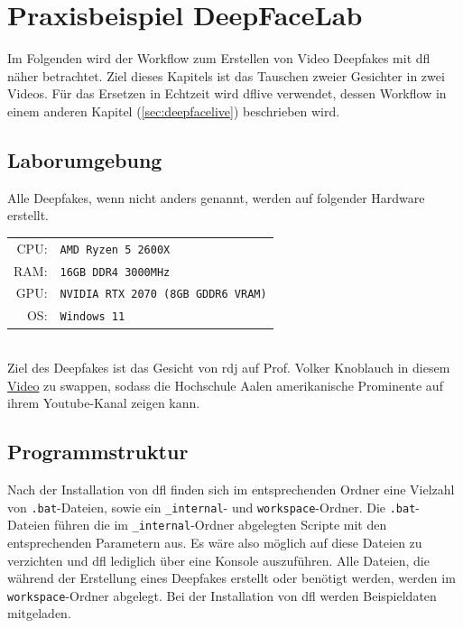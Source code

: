 \section{Praxisbeispiel DeepFaceLab}\label{sec:praxisbeispiel-dfl}
Im Folgenden wird der Workflow zum Erstellen von Video Deepfakes mit \gls{dfl} näher betrachtet.
Ziel dieses Kapitels ist das Tauschen zweier Gesichter in zwei Videos.
Für das Ersetzen in Echtzeit wird \gls{dflive} verwendet, dessen Workflow in einem anderen Kapitel (\ref{sec:deepfacelive}) beschrieben wird.

\subsection{Laborumgebung}\label{subsec:laborumgebung}
Alle Deepfakes, wenn nicht anders genannt, werden auf folgender Hardware erstellt.\\[0.5cm]
\begin{tabular}{rl}
    CPU:& \texttt{AMD Ryzen 5 2600X}\\
    RAM:& \texttt{16GB DDR4 3000MHz}\\
    GPU:& \texttt{NVIDIA RTX 2070 (8GB GDDR6 VRAM)}\\
    OS:& \texttt{Windows 11}
\end{tabular}\\[0.5cm]

Ziel des Deepfakes ist das Gesicht von \gls{rdj} auf Prof. Volker Knoblauch in diesem \href{https://www.youtube.com/watch?v=rksMPlRSbQU}{Video} zu swappen,
sodass die Hochschule Aalen amerikanische Prominente auf ihrem Youtube-Kanal zeigen kann.

\subsection{Programmstruktur}\label{subsec:programmstruktur}
Nach der Installation von \gls{dfl} finden sich im entsprechenden Ordner eine Vielzahl von \texttt{.bat}-Dateien, sowie ein \texttt{\_internal}- und \texttt{workspace}-Ordner.
Die \texttt{.bat}-Dateien führen die im \texttt{\_internal}-Ordner abgelegten Scripte mit den entsprechenden Parametern aus.
Es wäre also möglich auf diese Dateien zu verzichten und \gls{dfl} lediglich über eine Konsole auszuführen.
Alle Dateien, die während der Erstellung eines Deepfakes erstellt oder benötigt werden, werden im \texttt{workspace}-Ordner abgelegt.
Bei der Installation von \gls{dfl} werden Beispieldaten mitgeladen.\\

